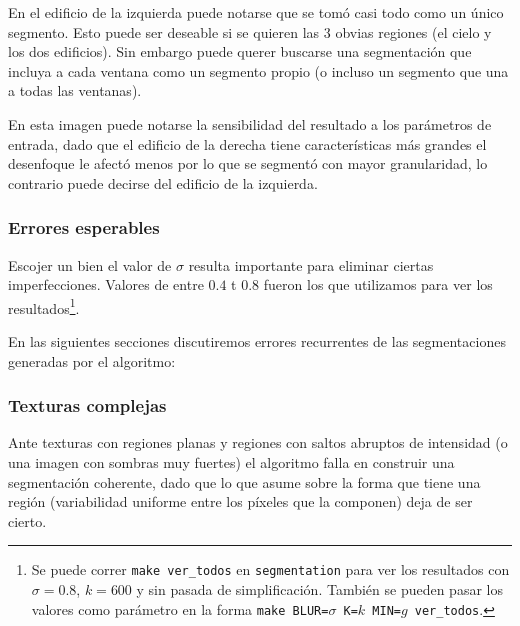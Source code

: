 En el edificio de la izquierda puede notarse que se tomó casi todo como un
único segmento. Esto puede ser deseable si se quieren las 3 obvias regiones (el
cielo y los dos edificios). Sin embargo puede querer buscarse una segmentación
que incluya a cada ventana como un segmento propio (o incluso un segmento que
una a todas las ventanas).

En esta imagen puede notarse la sensibilidad del resultado a los parámetros de
entrada, dado que el edificio de la derecha tiene características más grandes
el desenfoque le afectó menos por lo que se segmentó con mayor granularidad, lo
contrario puede decirse del edificio de la izquierda.

\subsubsection{Errores esperables}

Escojer un bien el valor de $\sigma$ resulta importante para eliminar ciertas
imperfecciones. Valores de entre $0.4$ t $0.8$ fueron los que utilizamos para
ver los resultados\footnote{Se puede correr \texttt{make ver\_todos} en
\texttt{segmentation} para ver los resultados con $\sigma = 0.8$, $k = 600$ y
sin pasada de simplificación. También se pueden pasar los valores como
parámetro en la forma \texttt{make BLUR=$\sigma$ K=$k$ MIN=$g$ ver\_todos}.}.

En las siguientes secciones discutiremos errores recurrentes de las
segmentaciones generadas por el algoritmo:

\subsubsection{Texturas complejas}

Ante texturas con regiones planas y regiones con saltos abruptos de intensidad
(o una imagen con sombras muy fuertes) el algoritmo falla en construir una
segmentación coherente, dado que lo que asume sobre la forma que tiene una
región (variabilidad uniforme entre los píxeles que la componen) deja de ser
cierto.

